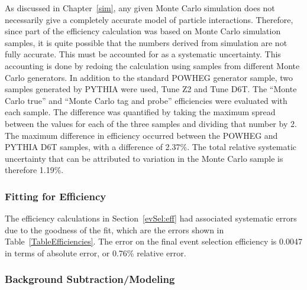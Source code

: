
As discussed in Chapter~\ref{sim}, 
any given Monte Carlo simulation 
does not necessarily give a completely accurate 
model of particle interactions.  %
Therefore, since part of the efficiency calculation 
was based on Monte Carlo simulation samples, 
it is quite possible that the numbers 
derived from simulation are not fully 
accurate.  
This must be accounted for as a systematic 
uncertainty.  
This accounting is done by 
redoing the calculation using samples 
from different Monte Carlo generators.  
In addition to the standard POWHEG generator 
sample, 
two samples generated by PYTHIA were used, 
Tune Z2 and Tune D6T.  
The ``Monte Carlo true'' and ``Monte Carlo tag and probe'' 
efficiencies were evaluated with each sample.  
The difference was quantified by taking the 
maximum spread between the values for each of the 
three samples 
and dividing that number by 2.  
The maximum difference in efficiency occurred 
between the POWHEG and PYTHIA D6T samples, 
with a difference of 2.37\%.  
The total relative systematic uncertainty that can be 
attributed to variation in the Monte Carlo 
sample is therefore 1.19\%.  



\subsubsection{Fitting for Efficiency}
\label{anMeth:SystsOtherFitEff}


The efficiency calculations in Section~\ref{evSel:eff} 
had associated systematic errors due to the 
goodness of the fit, 
which are the errors shown in Table~\ref{TableEfficiencies}.  
The error on the final event selection 
efficiency is 0.0047 in terms of absolute error, 
or 0.76\% relative error.  


\subsubsection{Background Subtraction/Modeling}
\label{anMeth:SystsOtherBGSub}


